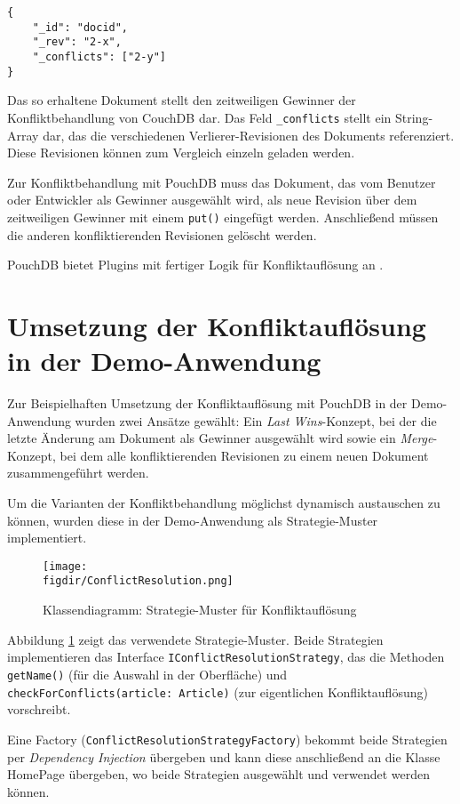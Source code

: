 \begin{codebox}
	\begin{lstlisting}[style=typescript]
{
	"_id": "docid",
	"_rev": "2-x",
	"_conflicts": ["2-y"]
}
	\end{lstlisting}
\end{codebox}

Das so erhaltene Dokument stellt den zeitweiligen Gewinner der Konfliktbehandlung von CouchDB dar.
Das Feld \texttt{\_conflicts} stellt ein String-Array dar, das die verschiedenen Verlierer-Revisionen des Dokuments referenziert. Diese Revisionen können zum Vergleich einzeln geladen werden.

Zur Konfliktbehandlung mit PouchDB muss das Dokument, das vom Benutzer oder Entwickler als Gewinner ausgewählt wird, als neue Revision über dem zeitweiligen Gewinner mit einem \texttt{put()} eingefügt werden. Anschließend müssen die anderen konfliktierenden Revisionen gelöscht werden.

PouchDB bietet Plugins mit fertiger Logik für Konfliktauflösung an \cite{pouch:conflicts}.

\section{Umsetzung der Konfliktauflösung in der Demo-Anwendung}

Zur Beispielhaften Umsetzung der Konfliktauflösung mit PouchDB in der Demo-Anwendung wurden zwei Ansätze gewählt: Ein \emph{Last Wins}-Konzept, bei der die letzte Änderung am Dokument als Gewinner ausgewählt wird sowie ein \emph{Merge}-Konzept, bei dem alle konfliktierenden Revisionen zu einem neuen Dokument zusammengeführt werden.

Um die Varianten der Konfliktbehandlung möglichst dynamisch austauschen zu können, wurden diese in der Demo-Anwendung als Strategie-Muster implementiert.

\begin{figure}[htb]
	\centering
	\caption{Klassendiagramm: Strategie-Muster für Konfliktauflösung}
	\label{fig:conflictresolutionstrategy}
	\texttt{[image: \\figdir/ConflictResolution.png]}
\end{figure}

Abbildung \ref{fig:conflictresolutionstrategy} zeigt das verwendete Strategie-Muster. Beide Strategien implementieren das Interface \texttt{IConflictResolutionStrategy}, das die Methoden \texttt{getName()} (für die Auswahl in der Oberfläche) und \texttt{checkForConflicts(article: Article)} (zur eigentlichen Konfliktauflösung) vorschreibt.

Eine Factory (\texttt{ConflictResolutionStrategyFactory}) bekommt beide Strategien per \emph{Dependency Injection} übergeben und kann diese anschließend an die Klasse HomePage übergeben, wo beide Strategien ausgewählt und verwendet werden können.